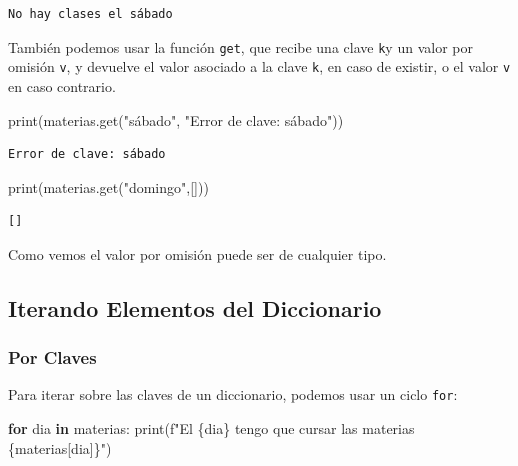 \documentclass[
  letterpaper,
  DIV=11,
  numbers=noendperiod]{scrreprt}
\newenvironment{Shaded}{\begin{snugshade}}{\end{snugshade}}
\newcommand{\BuiltInTok}[1]{\textcolor[rgb]{0.00,0.23,0.31}{#1}}
\newcommand{\ControlFlowTok}[1]{\textcolor[rgb]{0.00,0.23,0.31}{\textbf{#1}}}
\newcommand{\KeywordTok}[1]{\textcolor[rgb]{0.00,0.23,0.31}{\textbf{#1}}}
\newcommand{\NormalTok}[1]{\textcolor[rgb]{0.00,0.23,0.31}{#1}}
\newcommand{\SpecialCharTok}[1]{\textcolor[rgb]{0.37,0.37,0.37}{#1}}
\newcommand{\SpecialStringTok}[1]{\textcolor[rgb]{0.13,0.47,0.30}{#1}}
\newcommand{\StringTok}[1]{\textcolor[rgb]{0.13,0.47,0.30}{#1}}
\begin{document}
\begin{verbatim}
No hay clases el sábado
\end{verbatim}

También podemos usar la función \texttt{get}, que recibe una clave
\texttt{k}y un valor por omisión \texttt{v}, y devuelve el valor
asociado a la clave \texttt{k}, en caso de existir, o el valor
\texttt{v} en caso contrario.

\begin{Shaded}
\begin{Highlighting}[]
\BuiltInTok{print}\NormalTok{(materias.get(}\StringTok{"sábado"}\NormalTok{, }\StringTok{"Error de clave: sábado"}\NormalTok{))}
\end{Highlighting}
\end{Shaded}

\begin{verbatim}
Error de clave: sábado
\end{verbatim}

\begin{Shaded}
\begin{Highlighting}[]
\BuiltInTok{print}\NormalTok{(materias.get(}\StringTok{"domingo"}\NormalTok{,[]))}
\end{Highlighting}
\end{Shaded}

\begin{verbatim}
[]
\end{verbatim}

Como vemos el valor por omisión puede ser de cualquier tipo.

\subsection{Iterando Elementos del
Diccionario}\label{iterando-elementos-del-diccionario}

\subsubsection{Por Claves}\label{por-claves}

Para iterar sobre las claves de un diccionario, podemos usar un ciclo
\texttt{for}:

\begin{Shaded}
\begin{Highlighting}[]
\ControlFlowTok{for}\NormalTok{ dia }\KeywordTok{in}\NormalTok{ materias:}
    \BuiltInTok{print}\NormalTok{(}\SpecialStringTok{f"El }\SpecialCharTok{\{}\NormalTok{dia}\SpecialCharTok{\}}\SpecialStringTok{ tengo que cursar las materias }\SpecialCharTok{\{}\NormalTok{materias[dia]}\SpecialCharTok{\}}\SpecialStringTok{"}\NormalTok{)}
\end{Highlighting}
\end{Shaded}
\end{document}

